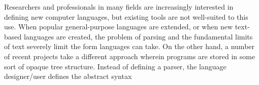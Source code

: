 Researchers and professionals in many fields are increasingly interested in defining new computer languages, but existing tools are not well-suited to this use. When popular general-purpose languages are extended, or when new text-based languages are created, the problem of parsing and the fundamental limits of text severely limit the form languages can take. On the other hand, a number of recent projects take a different approach wherein programs are stored in some sort of opaque tree structure. Instead of defining a parser, the language designer/user defines the abstract syntax 